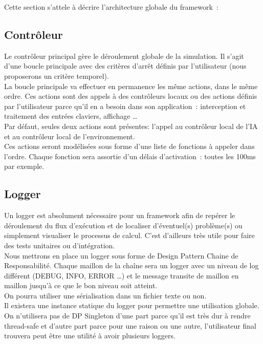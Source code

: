 Cette section s'attele à décrire l'architecture globale du framework~:

\subsection{Contrôleur}

Le contrôleur principal gère le déroulement globale de la simulation. Il s'agit d'une boucle principale avec des critères d'arrêt définis par l'utilisateur (nous proposerons un critère temporel).\\
\indent La boucle principale va effectuer en permanence les même actions, dans le même ordre. Ces actions sont des appels à des contrôleurs locaux ou des actions définis par l'utilisateur parce qu'il en a besoin dans son application~: interception et traitement des entrées claviers, affichage \ldots \\
\indent Par défaut, seules deux actions sont présentes: l'appel au contrôleur local de l'IA et au contrôleur local de l'environnement.\\

Ces actions seront modélisées sous forme d'une liste de fonctions à appeler dans l'ordre. Chaque fonction sera assortie d'un délais d'activation~: toutes les 100ms par exemple.

\subsection{Logger}
Un logger est absolument nécessaire pour un framework afin de repérer le déroulement du flux d'exécution et de localiser d'éventuel(s) problème(s) ou simplement visualiser le processus de calcul. C'est d'ailleurs très utile pour faire des tests unitaires ou d'intégration.\\

\indent Nous mettrons en place un logger sous forme de Design Pattern Chaine de Responsabilité. Chaque maillon de la chaîne sera un logger avec un niveau de log différent (DEBUG, INFO, ERROR \ldots ) et le message transite de maillon en maillon jusqu'à ce que le bon niveau soit atteint.\\
\indent On pourra utiliser une sérialisation dans un fichier texte ou non.\\

Il existera une instance statique du logger pour permettre une utilisation globale. On n'utilisera pas de DP Singleton d'une part parce qu'il est très dur à rendre thread-safe et d'autre part parce pour une raison ou une autre, l'utilisateur final trouvera peut être une utilité à avoir plusieurs loggers.

